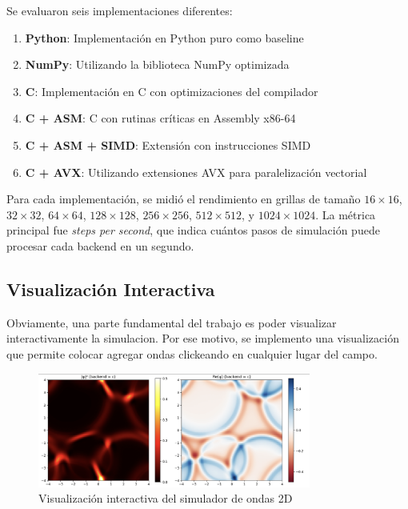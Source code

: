 \documentclass[a4paper]{article}
\begin{document}
Se evaluaron seis implementaciones diferentes:
\begin{enumerate}
    \item \textbf{Python}: Implementación en Python puro como baseline
    \item \textbf{NumPy}: Utilizando la biblioteca NumPy optimizada
    \item \textbf{C}: Implementación en C con optimizaciones del compilador
    \item \textbf{C + ASM}: C con rutinas críticas en Assembly x86-64
    \item \textbf{C + ASM + SIMD}: Extensión con instrucciones SIMD
    \item \textbf{C + AVX}: Utilizando extensiones AVX para paralelización vectorial
\end{enumerate}

Para cada implementación, se midió el rendimiento en grillas de tamaño $16 \times 16$, $32 \times 32$, $64 \times 64$, $128 \times 128$, $256 \times 256$, $512 \times 512$, y $1024 \times 1024$. La métrica principal fue \textit{steps per second}, que indica cuántos pasos de simulación puede procesar cada backend en un segundo.



\subsection{Visualización Interactiva}
Obviamente, una parte fundamental del trabajo es poder visualizar interactivamente la simulacion. Por ese motivo, se implemento una visualización que permite colocar
agregar ondas clickeando en cualquier lugar del campo.

\begin{figure}[h]
    \centering
    \includegraphics[width=0.8\textwidth]{extra/live_visualization.png}
    \caption{Visualización interactiva del simulador de ondas 2D}
    \label{fig:live_visualization}
\end{figure}
\end{document}
